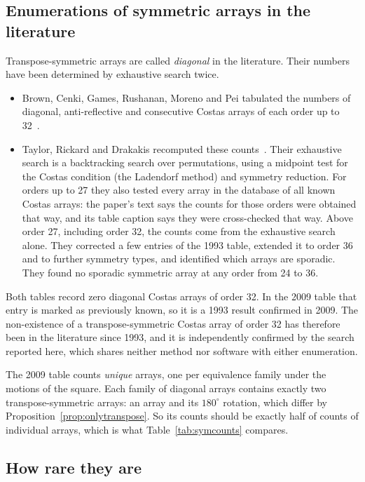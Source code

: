 \documentclass[11pt,a4paper]{article}
\theoremstyle{definition}
\begin{document}
\subsection{Enumerations of symmetric arrays in the literature}\label{sec:censuses}
Transpose-symmetric arrays are called \emph{diagonal} in the literature. Their numbers have been
determined by exhaustive search twice.
\begin{itemize}
\item Brown, Cenki, Games, Rushanan, Moreno and Pei tabulated the numbers of diagonal,
anti-reflective and consecutive Costas arrays of each order up to 32~\cite{brown1993}.
\item Taylor, Rickard and Drakakis recomputed these counts~\cite{taylor2009}. Their exhaustive
search is a backtracking search over permutations, using a midpoint test for the Costas condition
(the Ladendorf method) and symmetry reduction. For orders up to 27 they also tested every array in
the database of all known Costas arrays: the paper's text says the counts for those orders were
obtained that way, and its table caption says they were cross-checked that way. Above order 27,
including order 32, the counts come from the exhaustive search alone. They corrected a few entries
of the 1993 table, extended it to order 36 and to further symmetry types, and identified which
arrays are sporadic.
They found no sporadic symmetric array at any order from 24 to 36.
\end{itemize}
Both tables record zero diagonal Costas arrays of order 32. In the 2009 table that entry is
marked as previously known, so it is a 1993 result confirmed in 2009. The non-existence of a
transpose-symmetric Costas array of order 32 has therefore been in the literature since 1993, and
it is independently confirmed by the search reported here, which shares neither method nor
software with either enumeration.

The 2009 table counts \emph{unique} arrays, one per equivalence family under the motions of the
square. Each family of diagonal arrays contains exactly two transpose-symmetric arrays: an array
and its $180^\circ$ rotation, which differ by Proposition~\ref{prop:onlytranspose}. So its counts
should be exactly half of counts of individual arrays, which is what Table~\ref{tab:symcounts}
compares.

\subsection{How rare they are}
\end{document}
